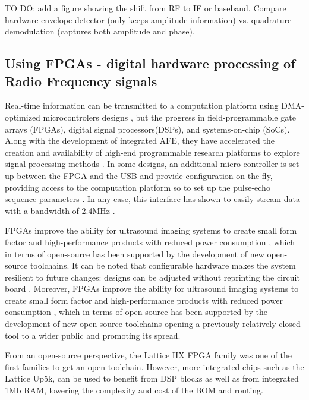 \documentclass{article}
\begin{document}
TO DO: add a figure showing the shift from RF to IF or baseband. Compare hardware envelope detector (only keeps amplitude information) vs. quadrature demodulation (captures both amplitude and phase).

\subsection{Using FPGAs - digital hardware processing of Radio Frequency signals}

Real-time information can be transmitted to a computation platform using DMA-optimized microcontrolers designs \cite{kidav_architecture_2019}, but the progress in field-programmable gate arrays (FPGAs), digital signal processors(DSPs), and systems-on-chip (SoCs). Along with the development of integrated AFE, they have accelerated the creation and availability of high-end programmable research platforms to explore signal processing methods \cite{roman_open-source_2018}.  In some designs, an additional micro-controller is set up between the FPGA and the USB and provide configuration on the fly, providing access to the computation platform so to set up the pulse-echo sequence parameters \cite{raj_microcontroller_2017,raj_8051_2016}. In any case, this interface has shown to easily stream data with a bandwidth of 2.4MHz \cite{pashaei_live_2018,schneider_fully_2010}.

FPGAs improve the ability for ultrasound imaging systems to create small form factor and high-performance products with reduced power consumption \cite{dusa_low_2014}, which in terms of open-source has been supported by the development of new open-source toolchains. It can be noted that configurable hardware makes the system resilient to future changes: designs can be adjusted without reprinting the circuit board \cite{zhang_fpga_2012,qiu_programmable_2010,ibrahim_single-fpga_2017}. Moreover, FPGAs improve the ability for ultrasound imaging systems to create small form factor and high-performance products with reduced power consumption \cite{dusa_low_2014}, which in terms of open-source has been supported by the development of new open-source toolchains \cite{shah_yosys+nextpnr:_2019} opening a previously relatively closed tool to a wider public \cite{saiz-vela_low-cost_2020} and promoting its spread.

From an open-source perspective, the Lattice HX FPGA family was one of the first families to get an open toolchain. However, more integrated chips such as the Lattice Up5k, can be used to benefit from DSP blocks as well as from integrated 1Mb RAM, lowering the complexity and cost of the BOM and routing. 
\end{document}
